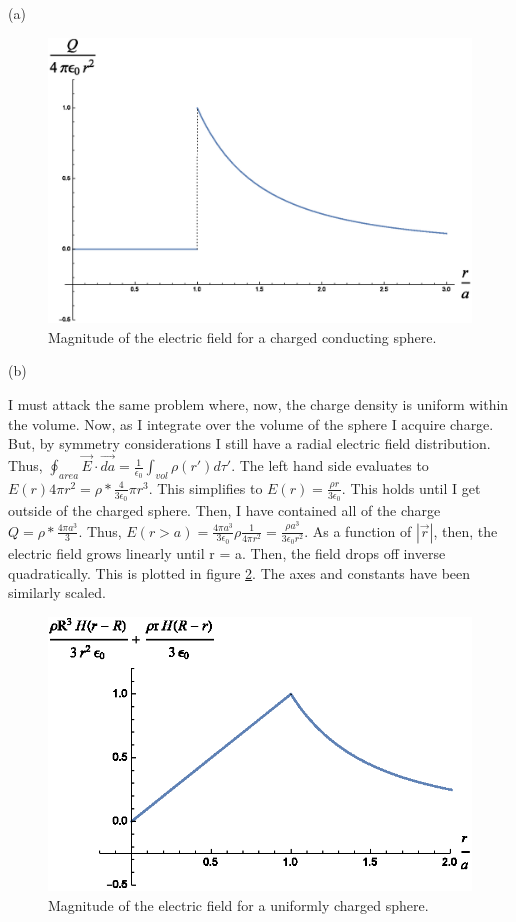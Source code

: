 \begin{homeworkProblem}
\begin{homeworkSection}{(a)}
\begin{figure}%
\centerline{\includegraphics[width=.65\columnwidth,height=.25\paperheight]{./Images/chargedconductor.eps}}%
\caption{Magnitude of the electric field for a charged conducting sphere.}%
\label{chargedconductor}%
\end{figure}

\end{homeworkSection}

\begin{homeworkSection}{(b)}

I must attack the same problem where, now, the charge density is uniform within the volume. Now, as I integrate over the volume of the sphere I acquire charge. But, by symmetry considerations I still have a radial electric field distribution. Thus, $\oint_{area} \vec{E}\cdot \vec{da} = \frac{1}{\epsilon_0} \int_{vol} \rho(r')d\tau'$. The left hand side evaluates to $E(r) 4\pi r^2 = \rho * \frac{4}{3 \epsilon_0}\pi r^3$. This simplifies to $E(r) = \frac{\rho r}{3 \epsilon_0}$. This holds until I get outside of the charged sphere. Then, I have contained all of the charge $Q = \rho * \frac{4\pi a^3}{3}$. Thus, $E(r>a) = \frac{4\pi a^3}{3\epsilon_0} \rho \frac{1}{4\pi r^2} = \frac{\rho a^3}{3\epsilon_0 r^2}$. As a function of $|\vec{r}|$, then, the electric field grows linearly until r = a. Then, the field drops off inverse quadratically. This is plotted in figure \ref{uniformsphere}. The axes and constants have been similarly scaled.

\begin{figure}%
\centerline{\includegraphics[width=.65\columnwidth,height=.25\paperheight]{./Images/uniformsphere.eps}}%
\caption{Magnitude of the electric field for a uniformly charged sphere.}%
\label{uniformsphere}%
\end{figure}


\end{homeworkSection}
\end{homeworkProblem}
